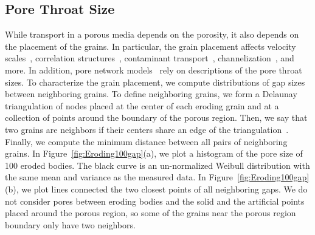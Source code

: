 \documentclass[preprint,10pt]{elsarticle}
\begin{document}
\subsection{Pore Throat Size}
\label{sec:throats}
While transport in a porous media depends on the porosity, it also
depends on the placement of the grains.  In particular, the grain
placement affects velocity scales~\cite{ali-par-wei-bre2017},
correlation structures~\cite{leb-ded-dav-bou2007}, contaminant
transport~\cite{knu-car2005},
channelization~\cite{sie-ili-pri-riv-gua2019}, and more. In addition,
pore network models~\cite{bry-kin-mel1993, bry-mel-cad1993, bij-blu2006}
rely on descriptions of the pore throat sizes. To characterize the grain
placement, we compute distributions of gap sizes between neighboring
grains.  To define neighboring grains, we form a Delaunay triangulation
of nodes placed at the center of each eroding grain and at a collection
of points around the boundary of the porous region.  Then, we say that
two grains are neighbors if their centers share an edge of the
triangulation~\cite{dea-qua-bir-jua2018}.  Finally, we compute the
minimum distance between all pairs of neighboring grains.  In
Figure~\ref{fig:Eroding100gap}(a), we plot a histogram of the pore size
of 100 eroded bodies.  The black curve is an un-normalized Weibull
distribution with the same mean and variance as the measured data.  In
Figure~\ref{fig:Eroding100gap}(b), we plot lines connected the two
closest points of all neighboring gaps. We do not consider pores between
eroding bodies and the solid and the artificial points placed around the
porous region, so some of the grains near the porous region boundary
only have two neighbors.
\end{document}
